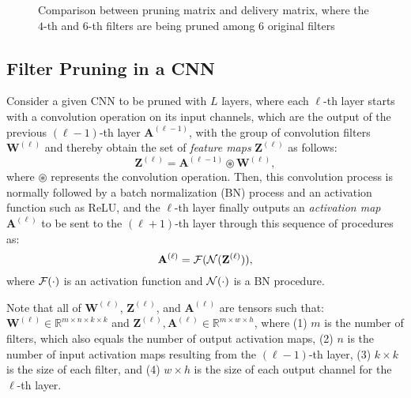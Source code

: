 \begin{figure*}[t]
	\centering
    \caption{Comparison between pruning matrix and delivery matrix, where the $4$-th and $6$-th filters are being pruned among $6$ original filters}
	\label{fig:matrix}
	\vspace{-2mm}
\end{figure*}


\subsection{Filter Pruning in a CNN}
Consider a given CNN to be pruned with $L$ layers, where each $\ell$-th layer starts with a convolution operation on its input channels, which are the output of the previous $(\ell-1)$-th layer $\mathbf{A}^{(\ell-1)}$, with the group of convolution filters $\mathbf{W}^{{(\ell)}}$ and thereby obtain the set of \textit{feature maps} $\mathbf{Z}^{(\ell)}$ as follows:
\begin{equation}
\boldsymbol{\mathbf{Z}}^{(\ell)} = {\mathbf{A}^{(\ell-1)} \circledast {\mathbf{W}}^{(\ell)}},
\nonumber
\end{equation}
where $\circledast$ represents the convolution operation. Then, this convolution process is normally followed by a batch normalization (BN) process and an activation function such as ReLU, and the $\ell$-th layer finally outputs an \textit{activation map} $\mathbf{A}^{(\ell)}$ to be sent to the $(\ell+1)$-th layer through this sequence of procedures as:
\begin{equation}
\mathbf{A}^{(\ell)} = \mathcal{F}(\mathcal{N}(\mathbf{Z}^{(\ell)})),
\nonumber
\end{equation}
where $\mathcal{F}(\cdot)$ is an activation function and $\mathcal{N}(\cdot)$ is a BN procedure.

Note that all of $\mathbf{W}^{(\ell)}$, $\mathbf{Z}^{(\ell)}$, and $\mathbf{A}^{(\ell)}$ are tensors such that: $\mathbf{W}^{(\ell)} \in \mathbb{R}^{m \times n \times k \times k}$ and $\mathbf{Z}^{(\ell)},\mathbf{A}^{(\ell)} \in \mathbb{R}^{m \times w \times h}$, where (1) $m$ is the number of filters, which also equals the number of output activation maps, (2) $n$ is the number of input activation maps resulting from the $(\ell-1)$-th layer, (3) $k \times k$ is the size of each filter, and (4) $w \times h$ is the size of each output channel for the $\ell$-th layer.

